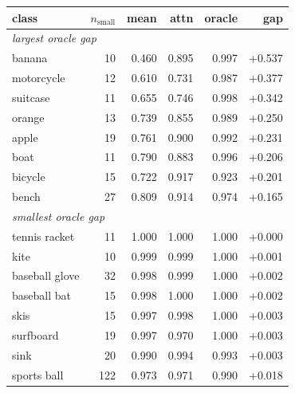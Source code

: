 \begin{tabular}{lrrrrr}
\toprule
class & $n_{\mathrm{small}}$ & mean & attn & oracle & gap \\
\midrule
\multicolumn{6}{l}{\emph{largest oracle gap}} \\
banana & 10 & 0.460 & 0.895 & 0.997 & +0.537 \\
motorcycle & 12 & 0.610 & 0.731 & 0.987 & +0.377 \\
suitcase & 11 & 0.655 & 0.746 & 0.998 & +0.342 \\
orange & 13 & 0.739 & 0.855 & 0.989 & +0.250 \\
apple & 19 & 0.761 & 0.900 & 0.992 & +0.231 \\
boat & 11 & 0.790 & 0.883 & 0.996 & +0.206 \\
bicycle & 15 & 0.722 & 0.917 & 0.923 & +0.201 \\
bench & 27 & 0.809 & 0.914 & 0.974 & +0.165 \\
\midrule
\multicolumn{6}{l}{\emph{smallest oracle gap}} \\
tennis racket & 11 & 1.000 & 1.000 & 1.000 & +0.000 \\
kite & 10 & 0.999 & 0.999 & 1.000 & +0.001 \\
baseball glove & 32 & 0.998 & 0.999 & 1.000 & +0.002 \\
baseball bat & 15 & 0.998 & 1.000 & 1.000 & +0.002 \\
skis & 15 & 0.997 & 0.998 & 1.000 & +0.003 \\
surfboard & 19 & 0.997 & 0.970 & 1.000 & +0.003 \\
sink & 20 & 0.990 & 0.994 & 0.993 & +0.003 \\
sports ball & 122 & 0.973 & 0.971 & 0.990 & +0.018 \\
\bottomrule
\end{tabular}
